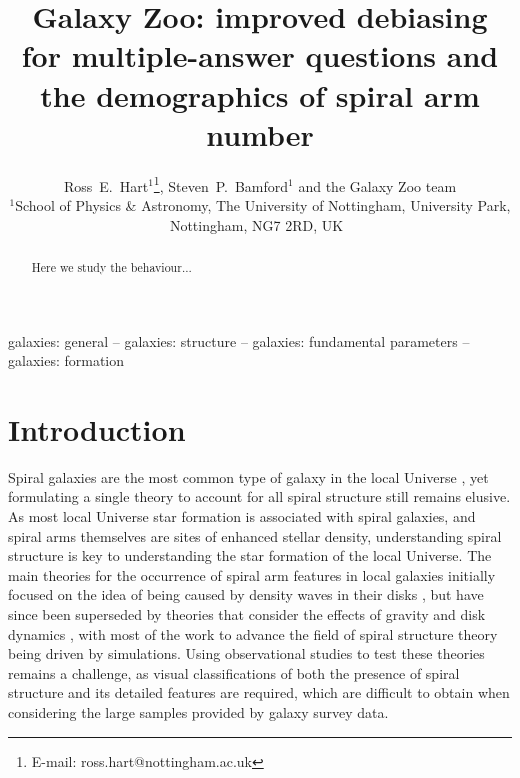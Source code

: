 \documentclass[useAMS,usenatbib]{mn2e}
\begin{document}
\title[Galaxy Zoo: debiasing and spiral arm number]{Galaxy Zoo: improved debiasing for multiple-answer questions and the demographics of spiral arm number}
\author[Hart et al.]{Ross~E.~Hart$^1$\thanks{E-mail: ross.hart@nottingham.ac.uk}, Steven~P.~Bamford$^1$ and the Galaxy Zoo team
\smallskip\\
$^{1}$School of Physics \& Astronomy, The University of Nottingham, University Park, Nottingham, NG7 2RD, UK\
}
\maketitle
\begin{abstract}
Here we study the behaviour...
\end{abstract}

\begin{keywords}
galaxies: general -- galaxies: structure -- galaxies: fundamental parameters -- galaxies: formation
\end{keywords}

\section{Introduction}
\label{sec:intro}
Spiral galaxies are the most common type of galaxy in the local Universe \citep{Lintott_11,Willett_13}, yet formulating a single theory to account for all spiral structure still remains elusive. As most local Universe star formation is associated with spiral galaxies, and spiral arms themselves are sites of enhanced stellar density, understanding spiral structure is key to understanding the  star formation of the local Universe. The main theories for the occurrence of spiral arm features in local galaxies initially focused on the idea of being caused by density waves in their disks \citep{Lindblad_63,Lin_64}, but have since been superseded by theories that consider the effects of gravity and disk dynamics \citep{Toomre_81,Sellwood_84}, with most of the work to advance the field of spiral structure theory being driven by simulations. Using observational studies to test these theories remains a challenge, as visual classifications of both the presence of spiral structure and its detailed features are required, which are difficult to obtain when considering the large samples provided by galaxy survey data.
\end{document}
